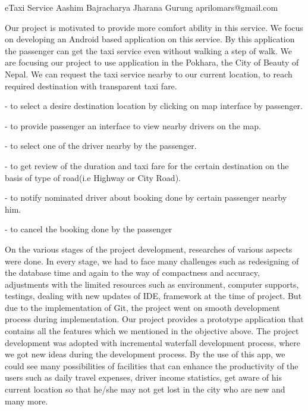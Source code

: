  \begin{conf-abstract}[]
 {eTaxi Service}
 {Aashim Bajracharya
 	 Jharana Gurung
 }
{aprilomars@gmail.com}

Our project is motivated to provide more comfort ability in this service. We focus on developing an Android based application on this service. By this application the passenger can get the taxi service even without walking a step of walk. We are focusing our project to use application in the Pokhara, the City of Beauty of Nepal. We can request the taxi service nearby to our current location, to reach required destination with transparent taxi fare.

- to select a desire destination location by clicking on map interface by passenger.

- to provide passenger an interface to view nearby drivers on the map.

- to select one of the driver nearby by the passenger.

- to get review of the duration and taxi fare for the certain destination on the basis of type of road(i.e Highway or City Road).

- to notify nominated driver about booking done by certain passenger nearby him.

- to cancel the booking done by the passenger

On the various stages of the project development, researches of various aspects were done. In every stage, we had to face many challenges such as redesigning of the database time and again to the way of compactness and accuracy, adjustments with the limited resources such as environment, computer supports, testings, dealing with new updates of IDE, framework at the time of project. But due to the implementation of Git, the project went on smooth development process during implementation. Our project provides a prototype application that contains all the features which we mentioned in the objective above. The project development was adopted with incremental waterfall development process, where we got new ideas during the development process. By the use of this app, we could see many possibilities of facilities that can enhance the productivity of the users such as daily travel expenses, driver income statistics, get aware of his current location so that he/she may not get lost in the city who are new and many more. 

 \end{conf-abstract}
